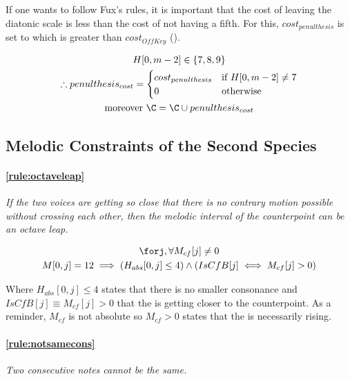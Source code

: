 If one wants to follow Fux's rules, it is important that the cost of leaving the diatonic scale is less than the cost of not having a fifth. For this, $cost_{penulthesis}$ is set to  which is greater than $cost_{OffKey}$ ().

\begin{equation}
    \begin{gathered}
        H[0, m-2] \in \{7, 8, 9\}\\
        \therefore penulthesis_{cost} = \begin{cases}
            cost_{penulthesis} & \text{if } H[0, m-2] \neq 7\\
            0 & \text{otherwise}
        \end{cases}\\
        \text{moreover } \C = \C \cup penulthesis_{cost}
    \end{gathered}
\end{equation}

\subsection{Melodic Constraints of the Second Species}

\paragraph{\ref{rule:octaveleap}} \textit{If the two voices are getting so close that there is no contrary motion possible without crossing each other, then the melodic interval of the counterpoint can be an octave leap.}

\begin{equation}
    \begin{gathered}
        \forj, \forall M_{cf}[j] \neq 0\\
        M[0, j] = 12 \implies (H_{abs}[0, j] \leq 4) \land (IsCfB[j] \iff M_{cf}[j]>0)
    \end{gathered}
\end{equation}

Where $H_{abs}[0, j] \leq 4$ states that there is no smaller consonance and $IsCfB[j] \equiv M_{cf}[j]>0$ that the \cf is getting closer to the counterpoint. As a reminder, $M_{cf}$ is not absolute so $M_{cf}>0$ states that the \cf is necessarily rising.

\paragraph{\ref{rule:notsamecons}} \textit{Two consecutive notes cannot be the same.}

